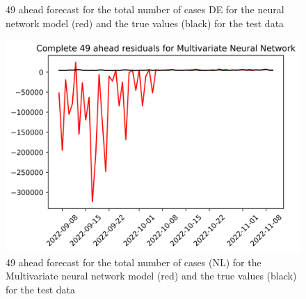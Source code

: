 \begin{figure}
\begin{minipage}{.32\textwidth}
  \caption{49 ahead forecast for the total number of cases DE for the neural network model (red) and the true values (black) for the test data}
  \label{fig:tot_cases_fc_49_nn_DE}
\end{minipage}
\begin{minipage}{.32\textwidth}
  \centering
  \includegraphics[width=\linewidth]{pics/49_ah/Complete_49_ahead_Multivariate Neural Network.png}
  \caption{49 ahead forecast for the total number of cases (NL) for the Multivariate neural network model (red) and the true values (black) for the test data}
  \label{fig:tot_cases_fc_49_mvnn}
\end{minipage}

\end{figure}
